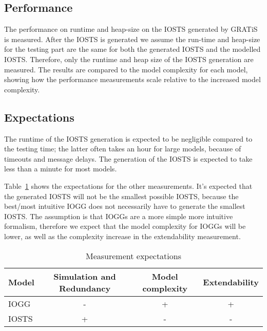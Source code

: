 \subsection{Performance}
The performance on runtime and heap-size on the IOSTS generated by GRATiS is measured. After the IOSTS is generated we assume the run-time and heap-size for the testing part are the same for both the generated IOSTS and the modelled IOSTS. Therefore, only the runtime and heap size of the IOSTS generation are measured. The results are compared to the model complexity for each model, showing how the performance measurements scale relative to the increased model complexity.

\subsection{Expectations}
The runtime of the IOSTS generation is expected to be negligible compared to the testing time; the latter often takes an hour for large models, because of timeouts and message delays. The generation of the IOSTS is expected to take less than a minute for most models.

Table~\ref{tab:expected} shows the expectations for the other measurements. It's expected that the generated IOSTS will not be the smallest possible IOSTS, because the best/most intuitive IOGG does not necessarily have to generate the smallest IOSTS. The assumption is that IOGGs are a more simple more intuitive formalism, therefore we expect that the model complexity for IOGGs will be lower, as well as the complexity increase in the extendability measurement.
\begin{table}[ht]
\begin{center}
\begin{tabular}{| l | c | c | c |}
  \hline
  \textbf{Model} & \textbf{Simulation and Redundancy} & \textbf{Model complexity} & \textbf{Extendability} \\ \hline
  IOGG & - & + & +\\ \hline
  IOSTS & + & - & -\\ \hline
\end{tabular}
\end{center}
\caption{Measurement expectations}
\label{tab:expected}
\end{table}
